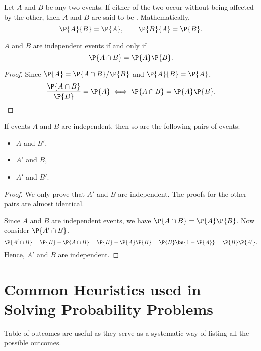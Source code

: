 \begin{definition}
    Let $A$ and $B$ be any two events. If either of the two occur without being affected by the other, then $A$ and $B$ are said to be . Mathematically, \[\P{A}{B} = \P{A}, \qquad \P{B}{A} = \P{B}.\]
\end{definition}

\begin{proposition}
    $A$ and $B$ are independent events if and only if \[\P{A \cap B} = \P{A}\P{B}.\]
\end{proposition}
\begin{proof}
    Since $\P{A} = \P{A \cap B} / \P{B}$ and $\P{A}{B} = \P{A}$, \[\frac{\P{A \cap B}}{\P{B}} = \P{A} \iff \P{A \cap B} = \P{A}\P{B}.\]
\end{proof}

\begin{proposition}
    If events $A$ and $B$ are independent, then so are the following pairs of events:
    \begin{itemize}
        \item $A$ and $B'$,
        \item $A'$ and $B$,
        \item $A'$ and $B'$.
    \end{itemize}
\end{proposition}
\begin{proof}
    We only prove that $A'$ and $B$ are independent. The proofs for the other pairs are almost identical.

    Since $A$ and $B$ are independent events, we have $\P{A \cap B} = \P{A} \P{B}$. Now consider $\P{A' \cap B}$. \[\P{A' \cap B} = \P{B} - \P{A \cap B} = \P{B} - \P{A}\P{B} = \P{B} \bs{1 - \P{A}} = \P{B} \P{A'}.\] Hence, $A'$ and $B$ are independent.
\end{proof}

\section{Common Heuristics used in Solving Probability Problems}

\begin{recipe}
    Table of outcomes are useful as they serve as a systematic way of listing all the possible outcomes.
\end{recipe}

